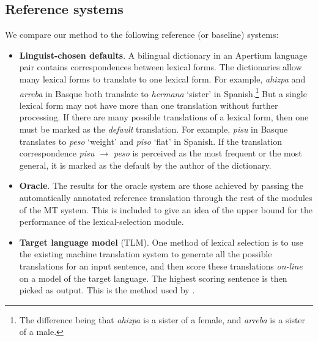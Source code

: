 \documentclass[11pt]{article}
\newcommand{\comment}[1]{\todo{#1}}
\begin{document}
\subsection{Reference systems}

We compare our method to the following reference (or baseline) systems:

\begin{itemize}
\item \textbf{Linguist-chosen defaults}. 
  A bilingual dictionary in an
  Apertium language pair contains correspondences between lexical
  forms. The dictionaries allow many lexical forms to translate to one
  lexical form. For example, \emph{ahizpa} and \emph{arreba} in Basque
  both translate to \emph{hermana} `sister' in Spanish.\footnote{The
    difference being that \emph{ahizpa} is a sister of a female, and
    \emph{arreba} is a sister of a male.} But a single lexical form
  may not have more than one translation without further
  processing. If there are many possible translations of a lexical
  form, then one must be marked as the \emph{default} translation. For
  example, \emph{pisu} in Basque translates to \emph{peso} `weight'
  and \emph{piso} `flat' in Spanish. If the translation correspondence
  \emph{pisu $\rightarrow$ peso} is perceived as the most frequent or
  the most general, it is marked as the default by the author of the dictionary. %

\item \textbf{Oracle}.  The results for the oracle system are those
  achieved by passing the automatically annotated reference
  translation through the rest of the modules of the MT system. This
  is included to give an idea of the upper bound for the performance
  of the lexical-selection module. %

\item \textbf{Target language model} (TLM). One method of lexical
  selection is to use the existing machine translation system to
  generate all the possible translations for an input sentence, and
  then score these translations \emph{on-line} on a model of the
  target language. The highest scoring sentence is then picked as
  output. This is the method used by %
  \cite{melero07a}.  
\end{itemize}
\end{document}
